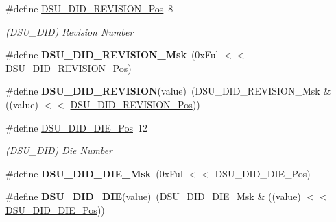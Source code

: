 \begin{DoxyCompactItemize}
\item 
\hypertarget{group___s_a_m_l21___d_s_u_gadf8c7ee986cf2cceec0a4d82efb513a2}{}\#define \hyperlink{group___s_a_m_l21___d_s_u_gadf8c7ee986cf2cceec0a4d82efb513a2}{D\+S\+U\+\_\+\+D\+I\+D\+\_\+\+R\+E\+V\+I\+S\+I\+O\+N\+\_\+\+Pos}~8\label{group___s_a_m_l21___d_s_u_gadf8c7ee986cf2cceec0a4d82efb513a2}

\begin{DoxyCompactList}\small\item\em (D\+S\+U\+\_\+\+D\+I\+D) Revision Number \end{DoxyCompactList}\item 
\hypertarget{group___s_a_m_l21___d_s_u_gab5dba5b8a06073b6c8a2cdffe5b4fc20}{}\#define {\bfseries D\+S\+U\+\_\+\+D\+I\+D\+\_\+\+R\+E\+V\+I\+S\+I\+O\+N\+\_\+\+Msk}~(0x\+Ful $<$$<$ D\+S\+U\+\_\+\+D\+I\+D\+\_\+\+R\+E\+V\+I\+S\+I\+O\+N\+\_\+\+Pos)\label{group___s_a_m_l21___d_s_u_gab5dba5b8a06073b6c8a2cdffe5b4fc20}

\item 
\hypertarget{group___s_a_m_l21___d_s_u_ga1c662b22d53f1e09610c2c4df24e26d8}{}\#define {\bfseries D\+S\+U\+\_\+\+D\+I\+D\+\_\+\+R\+E\+V\+I\+S\+I\+O\+N}(value)~(D\+S\+U\+\_\+\+D\+I\+D\+\_\+\+R\+E\+V\+I\+S\+I\+O\+N\+\_\+\+Msk \& ((value) $<$$<$ \hyperlink{group___s_a_m_l21___d_s_u_gadf8c7ee986cf2cceec0a4d82efb513a2}{D\+S\+U\+\_\+\+D\+I\+D\+\_\+\+R\+E\+V\+I\+S\+I\+O\+N\+\_\+\+Pos}))\label{group___s_a_m_l21___d_s_u_ga1c662b22d53f1e09610c2c4df24e26d8}

\item 
\hypertarget{group___s_a_m_l21___d_s_u_gacd344f630eefc7e02ceb5f8210017b8b}{}\#define \hyperlink{group___s_a_m_l21___d_s_u_gacd344f630eefc7e02ceb5f8210017b8b}{D\+S\+U\+\_\+\+D\+I\+D\+\_\+\+D\+I\+E\+\_\+\+Pos}~12\label{group___s_a_m_l21___d_s_u_gacd344f630eefc7e02ceb5f8210017b8b}

\begin{DoxyCompactList}\small\item\em (D\+S\+U\+\_\+\+D\+I\+D) Die Number \end{DoxyCompactList}\item 
\hypertarget{group___s_a_m_l21___d_s_u_ga41443f7e74fd63e24f7990557d9ebb28}{}\#define {\bfseries D\+S\+U\+\_\+\+D\+I\+D\+\_\+\+D\+I\+E\+\_\+\+Msk}~(0x\+Ful $<$$<$ D\+S\+U\+\_\+\+D\+I\+D\+\_\+\+D\+I\+E\+\_\+\+Pos)\label{group___s_a_m_l21___d_s_u_ga41443f7e74fd63e24f7990557d9ebb28}

\item 
\hypertarget{group___s_a_m_l21___d_s_u_gadcbee73ae2aeed99b44050be79c41b6d}{}\#define {\bfseries D\+S\+U\+\_\+\+D\+I\+D\+\_\+\+D\+I\+E}(value)~(D\+S\+U\+\_\+\+D\+I\+D\+\_\+\+D\+I\+E\+\_\+\+Msk \& ((value) $<$$<$ \hyperlink{group___s_a_m_l21___d_s_u_gacd344f630eefc7e02ceb5f8210017b8b}{D\+S\+U\+\_\+\+D\+I\+D\+\_\+\+D\+I\+E\+\_\+\+Pos}))\label{group___s_a_m_l21___d_s_u_gadcbee73ae2aeed99b44050be79c41b6d}


\end{DoxyCompactItemize}
